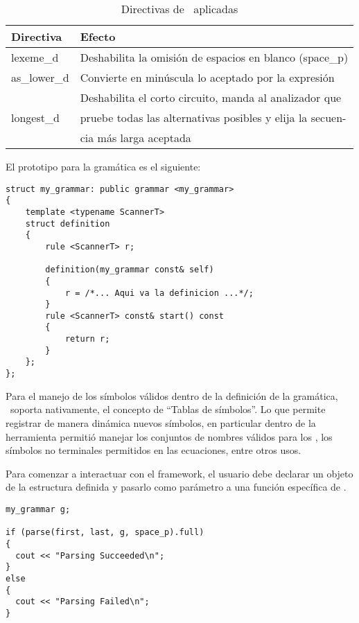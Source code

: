 \begin{table}[!ht]\centering\scriptsize
\begin{tabular}{| l | p{7.5cm} |}
\hline

\rowcolor{gris} \textbf{Directiva} & \textbf{Efecto} \\ \hline

lexeme\_d    & Deshabilita la omisión de espacios en blanco (space\_p)\\ \hline
as\_lower\_d & Convierte en minúscula lo aceptado por la expresión\\ \hline
\multirow{3}{*}{longest\_d} & Deshabilita el corto circuito, manda al analizador que\\
                            & pruebe todas las alternativas posibles y elija la secuen-\\
                            & cia más larga aceptada \\ \hline
\end{tabular}
\caption{\label{directivas} Directivas de \spirit\ aplicadas}
\end{table}

El prototipo para la gramática es el siguiente:

\begin{lstlisting}[float=!ht, columns=fullflexible, linewidth=9cm]
struct my_grammar: public grammar <my_grammar>
{
    template <typename ScannerT>
    struct definition
    {
        rule <ScannerT> r;

        definition(my_grammar const& self)
        {
            r = /*... Aqui va la definicion ...*/;
        }
        rule <ScannerT> const& start() const
        {
            return r;
        }
    };
};
\end{lstlisting}

Para el manejo de los símbolos válidos dentro de la definición de la gramática, \spirit\ soporta nativamente, el concepto de ``Tablas de símbolos''. Lo que permite registrar de manera dinámica nuevos símbolos, en particular dentro de la herramienta permitió manejar los conjuntos de nombres válidos para los , los símbolos no terminales permitidos en las ecuaciones, entre otros usos.

Para comenzar a interactuar con el framework, el usuario debe declarar un objeto de la estructura definida y pasarlo como parámetro a una función específica de \spirit.

\begin{lstlisting}[float=!ht, columns=fullflexible, linewidth=7cm]
my_grammar g;

if (parse(first, last, g, space_p).full)
{
  cout << "Parsing Succeeded\n";
}
else
{
  cout << "Parsing Failed\n";
}
\end{lstlisting}


